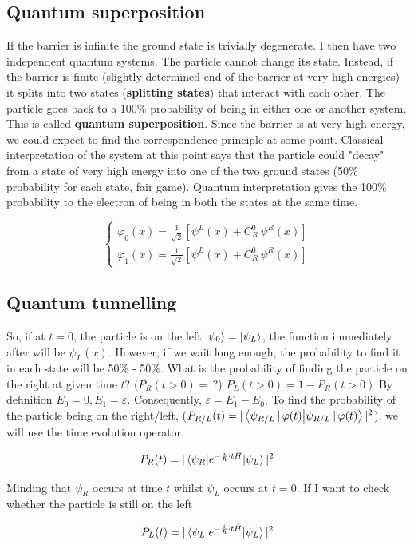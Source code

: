 	\subsection{Quantum superposition}
If the barrier is infinite the ground state is trivially degenerate.
I then have two independent quantum systems.
The particle cannot change its state.
Instead, if the barrier is finite (slightly determined end of the barrier at very high energies) it splits into two states (\textbf{splitting states}) that interact with each other.
The particle goes back to a 100\% probability of being in either one or another system.
This is called \textbf{quantum superposition}.
Since the barrier is at very high energy, we could expect to find the correspondence principle at some point.
Classical interpretation of the system at this point says that the particle could "decay" from a state of very high energy into one of the two ground states (50\% probability for each state, fair game).
Quantum interpretation gives the 100\% probability to the electron of being in both the states at the same time.

$$\begin{cases}\varphi_0(x) = \frac{1}{\sqrt{2}}[\psi^L(x)+C_R^0\,\psi^R(x)]\\\varphi_1(x) = \frac{1}{\sqrt{2}}[\psi^L(x)+C_R^0\,\psi^R(x)]\end{cases}$$

	\subsection{Quantum tunnelling}
	So, if at $t=0$, the  particle is on the left $\ket{\psi_0}=\ket{\psi_L}$, the function immediately after will be $\psi_L(x)$.
	However, if we wait long enough, the probability to find it in each state will be 50\% - 50\%.
	What is the probability of finding the particle on the right at given time $t$? $(P_R(t>0)=\,?$) $P_L(t>0)=1-P_R(t>0)$
	By definition $E_0=0, E_1= \varepsilon$.
	Consequently, $\varepsilon = E_1-E_0$,
	To find the probability of the particle being on the right/left, ($P_{R/L}(t)=|\braket{\psi_{R/L}\,|\,\varphi(t)}|^2$), we will use the time evolution operator.

	$$P_R(t)=|\mel{\psi_R}{e^{-\frac{i}{\hbar}\cdot t \hat{H}}}{\psi_L}|^2$$

	Minding that $\psi_R$ occurs at time $t$ whilst $\psi_L$ occurs at $t=0$.
	If I want to check whether the particle is still on the left

	$$P_L(t)=|\mel{\psi_L}{e^{-\frac{i}{\hbar}\cdot t \hat{H}}}{\psi_L}|^2$$

